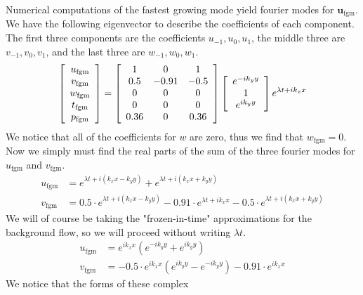 \documentclass{article} \usepackage{amsfonts,amsmath, amssymb, xcolor, amsthm,}
\begin{document}
        Numerical computations of the fastest growing mode yield fourier modes
        for $\bm{u}_{\text{fgm}}$. We have the following eigenvector to describe
        the coefficients of each component. The first three components are the
        coefficients $u_{-1}, u_0, u_1$, the middle three are $v_{-1}, v_0,
        v_1$, and the last three are $w_{-1}, w_0, w_1$.  
        \[
        \left[\begin{array}{c} u_{\text{fgm}} \\ v_{\text{fgm}} \\

        w_{\text{fgm}} \\
        t_{\text{fgm}} \\
        p_{\text{fgm}} \end{array}\right] =
        \left[\begin{array}{c c c} 1 & 0 & 1 \\ 0.5 & -0.91 & -0.5 \\ 0 & 0 & 0
        \\ 0 & 0 & 0 \\ 0.36 & 0 & 0.36 \end{array}\right]
        \left[\begin{array}{c} e^{-ik_yy} \\ 1 \\ e^{ik_yy} \end{array}\right]
        e^{\lambda t + ik_xx} \] We notice that all of the coefficients for $w$
        are zero, thus we find that $w_{\text{fgm}} = 0$. Now we simply must
        find the real parts of the sum of the three fourier modes for
        $u_{\text{fgm}}$ and $v_{\text{fgm}}$.  \begin{align*} u_{\text{fgm}} &=
        e^{\lambda t + i(k_xx - k_yy)} + e^{\lambda t + i(k_xx + k_yy)} \\
        v_{\text{fgm}} &= 0.5\cdot e^{\lambda t + i(k_xx - k_yy)} - 0.91\cdot
        e^{\lambda t + ik_xx} - 0.5\cdot e^{\lambda t + i(k_xx + k_yy)}
        \end{align*} We will of course be taking the "frozen-in-time"
        approximations for the background flow, so we will proceed without
        writing $\lambda t$.  \begin{align*} u_{\text{fgm}} &=
        e^{ik_xx}\left(e^{-ik_yy} + e^{ik_yy}\right) \\ v_{\text{fgm}} &=
        -0.5\cdot e^{ik_xx}\left(e^{ik_yy} - e^{-ik_yy}\right) - 0.91\cdot
        e^{ik_xx} \end{align*} We notice that the forms of these complex
\end{document}
